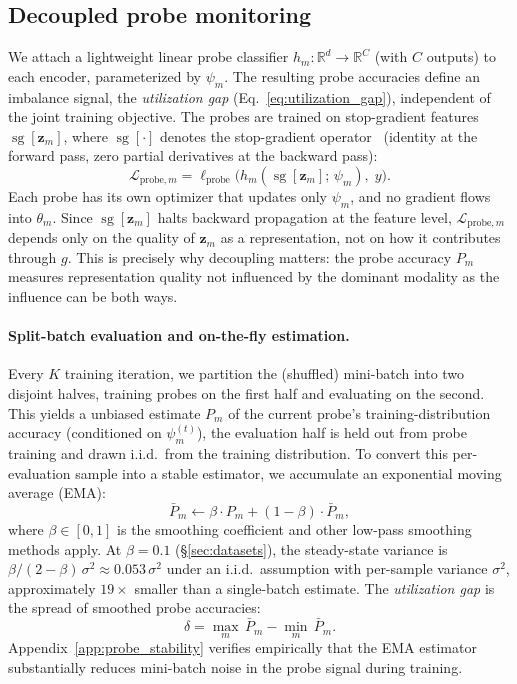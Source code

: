 \documentclass{article} %
\newcommand{\loss}{\mathcal{L}}
\newcommand{\probe}{h}
\newcommand{\sg}{\operatorname{sg}}
\begin{document}
\FloatBarrier
\subsection{Decoupled probe monitoring}
\label{sec:probes}

We attach a lightweight linear probe classifier $\probe_m\colon \mathbb{R}^d \to \mathbb{R}^C$ (with $C$ outputs) to each encoder, parameterized by $\psi_m$. The resulting probe accuracies define an imbalance signal, the \emph{utilization gap} (Eq.~\ref{eq:utilization_gap}), independent of the joint training objective. The probes are trained on stop-gradient features $\sg[\mathbf{z}_m]$, where $\sg[\cdot]$ denotes the stop-gradient operator~\citep{vandenoord2017vqvae} (identity at the forward pass, zero partial derivatives at the backward pass):
%
\begin{equation}
\label{eq:probe_loss}
\loss_{\text{probe},m} = \ell_{\text{probe}}\!\bigl(\probe_m(\sg[\mathbf{z}_m];\,\psi_m),\; y\bigr).
\end{equation}
%
Each probe has its own optimizer that updates only $\psi_m$, and no gradient flows into $\theta_m$. Since $\sg[\mathbf{z}_m]$ halts backward propagation at the feature level, $\loss_{\text{probe},m}$ depends only on the quality of $\mathbf{z}_m$ as a representation, not on how it contributes through $g$. This is precisely why decoupling matters: the probe accuracy $P_m$ measures representation quality not influenced by the dominant modality as the influence can be both ways.

\paragraph{Split-batch evaluation and on-the-fly estimation.}
Every $K$ training iteration, we partition the (shuffled) mini-batch into two disjoint halves, training probes on the first half and evaluating on the second. This yields a unbiased estimate $P_m$ of the current probe's training-distribution accuracy (conditioned on $\psi_m^{(t)}$), the evaluation half is held out from probe training and drawn i.i.d.\ from the training distribution. To convert this per-evaluation sample into a stable estimator, we accumulate an exponential moving average (EMA):
%
\begin{equation}
\label{eq:ema_probe}
\bar{P}_m \leftarrow \beta \cdot P_m + (1 - \beta) \cdot \bar{P}_m,
\end{equation}
%
where $\beta \in [0,1]$ is the smoothing coefficient and other low-pass smoothing methods apply. At $\beta = 0.1$ (\S\ref{sec:datasets}), the steady-state variance is $\beta/(2-\beta)\,\sigma^{2} \approx 0.053\,\sigma^{2}$ under an i.i.d.\ assumption with per-sample variance $\sigma^{2}$, approximately $19\times$ smaller than a single-batch estimate. The \emph{utilization gap} is the spread of smoothed probe accuracies:
%
\begin{equation}
\label{eq:utilization_gap}
\delta = \max_{m}\,\bar{P}_m - \min_{m}\,\bar{P}_m.
\end{equation}
%
Appendix~\ref{app:probe_stability} verifies empirically that the EMA estimator substantially reduces mini-batch noise in the probe signal during training.
\end{document}
